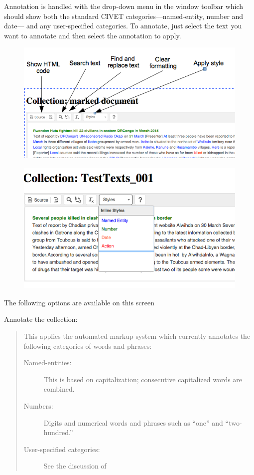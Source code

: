 \documentclass[letterpaper,10pt,english]{sphinxmanual}
\begin{document}
Annotation is handled with the  drop-down menu in the window
toolbar which should show both
the standard CIVET categories—named-entity, number and date— and any
user-specified categories. To annotate, just select the text you want to
annotate and then select the annotation to apply.
\begin{figure}[htbp]
\centering

\includegraphics{ckedit_menu.png}
\end{figure}
\begin{figure}[htbp]
\centering

\includegraphics{style_options.png}
\end{figure}

The following options are available on this screen

Annotate the collection:
\begin{quote}

This applies the automated markup system which currently annotates the following
categories of words and phrases:
\begin{description}
\item[{Named-entities:}] \leavevmode
This is based on capitalization; consecutive capitalized words
are combined.

\item[{Numbers:}] \leavevmode
Digits and numerical words and phrases such as “one” and
“two-hundred.”

\item[{User-specified categories:}] \leavevmode
See the discussion of {\hyperref[workspaces:sec-categories]{\emph{}}}

\end{description}
\end{quote}
\end{document}
